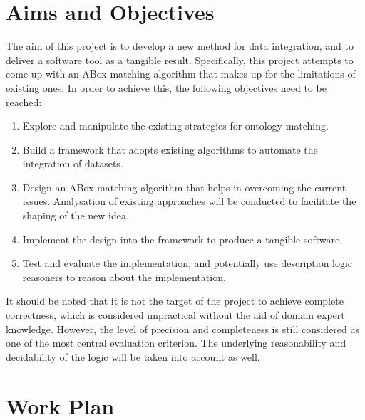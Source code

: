 \documentclass[a4paper,12pt,twoside]{article}
\begin{document}
\section{Aims and Objectives}


The aim of this project is to develop a new method for data integration, and to deliver a software tool as a tangible result. Specifically, this project attempts to come up with an ABox matching algorithm that makes up for the limitations of existing ones. In order to achieve this, the following objectives need to be reached:
\begin{enumerate}[itemsep=0.8em]
	\item Explore and manipulate the existing strategies for ontology matching.
	\item Build a framework that adopts existing algorithms to automate the integration of datasets.
	\item Design an ABox matching algorithm that helps in overcoming the current issues. Analysation of existing approaches will be conducted to facilitate the shaping of the new idea.
	\item Implement the design into the framework to produce a tangible software.
	\item Test and evaluate the implementation, and potentially use description logic reasoners to reason about the implementation.
\end{enumerate}
It should be noted that it is not the target of the project to achieve complete correctness, which is considered impractical without the aid of domain expert knowledge. However, the level of precision and completeness is still considered as one of the most central evaluation criterion. The underlying reasonability and decidability of the logic will be taken into account as well.


\section{Work Plan}

\end{document}
